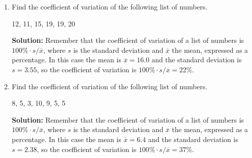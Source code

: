 \documentclass{article}
\begin{document}
\begin{enumerate}
  
\vspace{1cm}

\item Find the coefficient of variation of the following list of numbers.

\begin{center}
12, 11, 15, 19, 19, 20
\end{center}

\textbf{Solution:} Remember that the coefficient of variation of a list of numbers is $100\% \cdot s/\overline{x}$, where $s$ is the standard deviation and $\overline{x}$ the mean, expressed as a percentage. In this case the mean is $\overline{x} = 16.0$ and the standard deviation is $s = 3.55$, so the coefficient of variation is $100\% \cdot s/\overline{x} = 22\%$.


  
\vspace{1cm}

\item Find the coefficient of variation of the following list of numbers.

\begin{center}
8, 5, 3, 10, 9, 5, 5
\end{center}

\textbf{Solution:} Remember that the coefficient of variation of a list of numbers is $100\% \cdot s/\overline{x}$, where $s$ is the standard deviation and $\overline{x}$ the mean, expressed as a percentage. In this case the mean is $\overline{x} = 6.4$ and the standard deviation is $s = 2.38$, so the coefficient of variation is $100\% \cdot s/\overline{x} = 37\%$.


  
\vspace{1cm}
\end{enumerate}
\end{document}
